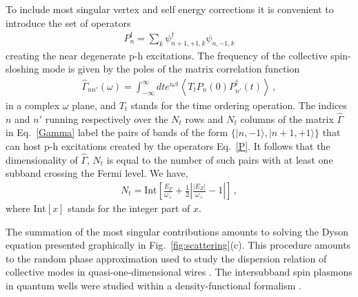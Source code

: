 To include most singular vertex and self energy corrections it is convenient to introduce the set of operators
\begin{align}\label{P}
P^{\dag}_{n} = \sum_{k} \psi_{n+1,+1, k}^{\dag} \psi_{n,-1, k}
\end{align}
creating the near degenerate p-h excitations.
The frequency of the collective spin-sloshing mode is given by the poles of the matrix correlation function
\begin{align}\label{Gamma}
\hat{\Gamma}_{nn'}(\omega) = \int_{-\infty}^{\infty} d t e^{  i \omega t}\left\langle T_t P_n(0) P^{\dag}_{n'}(t) \right\rangle\, ,
\end{align}
in a complex $\omega$ plane, and $T_{t}$ stands for the time ordering operation.
The indices $n$ and $n'$ running respectively over the $N_t$ rows and $N_t$ columns of the matrix $\hat{\Gamma}$ in Eq.~\eqref{Gamma} label the pairs of bands of the form $\{|n,-1\rangle, |n+1,+1 \rangle \}$ that can host p-h excitations created by the operators Eq.~\eqref{P}.
It follows that the dimensionality of $\hat{\Gamma}$, $N_t$ is equal to the number of such pairs with at least one subband crossing the Fermi level.
We have,
\begin{align}\label{Nt}
N_t = \mathrm{Int} 
\left[ \frac{E_F}{\omega_{\perp}} + \frac{1}{2} \left\vert \frac{|E_Z|}{\omega_{\perp}} - 1\right\vert \right]\, ,
\end{align}
where $\mathrm{Int} \left[ x \right]$ stands for the integer part of $x$.


The  summation of the most singular contributions amounts to solving the Dyson equation presented graphically in Fig.~\ref{fig:scattering}(c).  
This procedure amounts to the random phase approximation used to study the dispersion relation of collective modes in quasi-one-dimensional wires \cite{Li1989,Haupt1991}. 
The intersubband spin plasmons in quantum wells were studied within a density-functional formalism \cite{Ullrich2002,Ullrich2003}.



